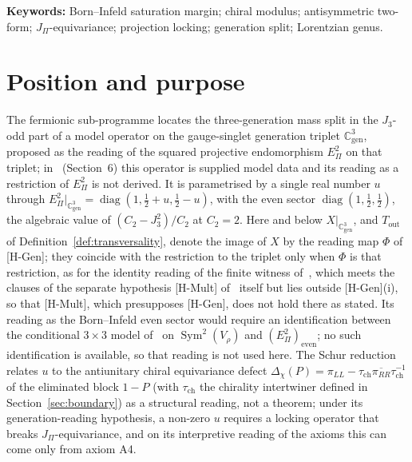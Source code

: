 \documentclass[11pt]{article}
\theoremstyle{definition}
\theoremstyle{remark}
\newcommand{\JPi}{J_{\Pi}}
\newcommand{\Jthree}{J_{3}}
\newcommand{\Cgen}{\mathbb{C}^{3}_{\mathrm{gen}}}
\newcommand{\Epi}{E_{\Pi}}
\newcommand{\diag}{\operatorname{diag}}
\begin{document}
  \noindent\textbf{Keywords:}
  Born--Infeld saturation margin; chiral modulus; antisymmetric two-form; \texorpdfstring{$\JPi$}{J_Π}-equivariance;
  projection locking; generation split; Lorentzian genus.

  \newpage

  \tableofcontents

  \newpage

  \section{Position and purpose}
    \label{sec:position}

    The fermionic sub-programme locates the three-generation mass split in the $\Jthree$-odd part of a model operator on
    the gauge-singlet generation triplet $\Cgen$, proposed as the reading of the squared projective endomorphism $\Epi^2$
    on that triplet; in~\cite{Beau2026q14} (Section~6) this operator is supplied model data and its reading as a
    restriction of $\Epi^2$ is not derived. It is parametrised by a single real number
    $u$ through $\Epi^2|_{\Cgen} = \diag(1, \tfrac12 + u, \tfrac12 - u)$, with the even sector
    $\diag(1, \tfrac12, \tfrac12)$, the algebraic value of $(C_2-J_3^2)/C_2$ at $C_2=2$.
    Here and below $X|_{\Cgen}$, and $T_{\mathrm{out}}$ of Definition~\ref{def:transversality}, denote the image of $X$
    by the reading map $\Phi$ of [H-Gen]; they coincide with the restriction to the triplet only when $\Phi$ is that restriction, as for the identity reading of
    the finite witness of~\cite{Beau2026ebj}, which meets the clauses of the separate
    hypothesis [H-Mult] of~\cite{Beau2026prs} itself but lies outside [H-Gen](i), so that [H-Mult], which presupposes
    [H-Gen], does not hold there as stated.
    Its reading as the Born--Infeld even sector would require an identification between the
    conditional $3\times3$ model of~\cite{Beau2026a34} on $\operatorname{Sym}^2(V_\rho)$ and
    $(E_\Pi^2)_{\mathrm{even}}$; no such identification is available, so that reading is not used
    here.
    The Schur reduction~\cite{Beau2026prs} relates $u$ to the antiunitary chiral equivariance defect
    $\Delta_\chi(P) = \pi_{LL} - \tau_{\mathrm{ch}} \overline{\pi_{RR}} \tau_{\mathrm{ch}}^{-1}$ of the eliminated block $1 - P$ (with $\tau_{\mathrm{ch}}$ the chirality intertwiner defined in Section~\ref{sec:boundary}) as a structural
    reading,
    not a theorem; under its generation-reading hypothesis, a non-zero $u$ requires a locking operator that breaks
    $\JPi$-equivariance, and on its interpretive reading of the axioms this can come only from axiom A4.
\end{document}
